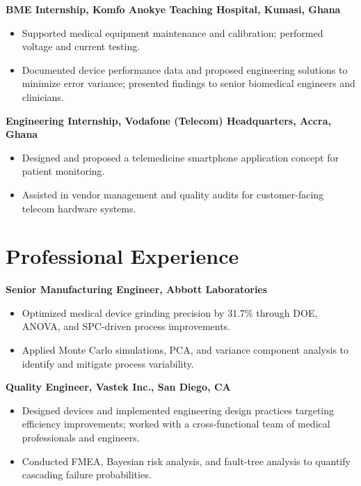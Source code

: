 \documentclass[10.5pt]{article}
\newcommand{\cventry}[2]{%
  \par\noindent\textbf{#1}\hfill\makebox[1.4in][r]{#2}\par
}
\begin{document}
\cventry{BME Internship, Komfo Anokye Teaching Hospital, Kumasi, Ghana}{2019}
\begin{itemize}
  \item Supported medical equipment maintenance and calibration; performed voltage and current testing.
  \item Documented device performance data and proposed engineering solutions to minimize error variance;
  presented findings to senior biomedical engineers and clinicians.
\end{itemize}

\cventry{Engineering Internship, Vodafone (Telecom) Headquarters, Accra, Ghana}{}
\begin{itemize}
  \item Designed and proposed a telemedicine smartphone application concept for patient monitoring.
  \item Assisted in vendor management and quality audits for customer-facing telecom hardware systems.
\end{itemize}

\section*{Professional Experience}

\cventry{Senior Manufacturing Engineer, Abbott Laboratories}{2024--2025}
\begin{itemize}
  \item Optimized medical device grinding precision by 31.7\% through DOE, ANOVA, and SPC-driven process improvements.
  \item Applied Monte Carlo simulations, PCA, and variance component analysis to identify and mitigate process variability.
\end{itemize}

\cventry{Quality Engineer, Vastek Inc., San Diego, CA}{2023--2024}
\begin{itemize}
  \item Designed devices and implemented engineering design practices targeting efficiency improvements; worked
  with a cross-functional team of medical professionals and engineers.
  \item Conducted FMEA, Bayesian risk analysis, and fault-tree analysis to quantify cascading failure probabilities.
\end{itemize}
\end{document}
